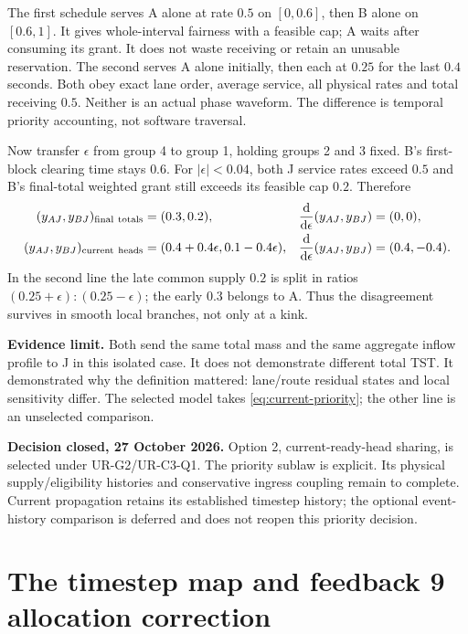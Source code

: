 \documentclass[11pt]{article}
\newcommand{\dd}{\mathrm d}
\begin{document}
The first schedule serves A alone at rate $0.5$ on $[0,0.6]$, then B alone on $[0.6,1]$. It gives whole-interval fairness with a feasible cap; A waits after consuming its grant. It does not waste receiving or retain an unusable reservation. The second serves A alone initially, then each at $0.25$ for the last $0.4$ seconds. Both obey exact lane order, average service, all physical rates and total receiving $0.5$. Neither is an actual phase waveform. The difference is temporal priority accounting, not software traversal.

Now transfer $\epsilon$ from group 4 to group 1, holding groups 2 and 3 fixed. B's first-block clearing time stays $0.6$. For $|\epsilon|<0.04$, both J service rates exceed $0.5$ and B's final-total weighted grant still exceeds its feasible cap $0.2$. Therefore
\begin{align}
 (y_{AJ},y_{BJ})_{\rm final\ totals}&=(0.3,0.2),
 &\frac{\dd}{\dd\epsilon}(y_{AJ},y_{BJ})&=(0,0),\label{eq:total-priority}\\
 (y_{AJ},y_{BJ})_{\rm current\ heads}&=(0.4+0.4\epsilon,0.1-0.4\epsilon),
 &\frac{\dd}{\dd\epsilon}(y_{AJ},y_{BJ})&=(0.4,-0.4).
 \label{eq:current-priority}
\end{align}
In the second line the late common supply $0.2$ is split in ratios $(0.25+\epsilon):(0.25-\epsilon)$; the early $0.3$ belongs to A. Thus the disagreement survives in smooth local branches, not only at a kink.

\textbf{Evidence limit.} Both send the same total mass and the same aggregate inflow profile to J in this isolated case. It does not demonstrate different total TST. It demonstrated why the definition mattered: lane/route residual states and local sensitivity differ. The selected model takes \eqref{eq:current-priority}; the other line is an unselected comparison.

\textbf{Decision closed, 27 October 2026.} Option 2, current-ready-head sharing, is selected under UR-G2/UR-C3-Q1. The priority sublaw is explicit. Its physical supply/eligibility histories and conservative ingress coupling remain to complete. Current propagation retains its established timestep history; the optional event-history comparison is deferred and does not reopen this priority decision.

\section{The timestep map and feedback 9 allocation correction}
\label{sec:step-admission}
\end{document}
